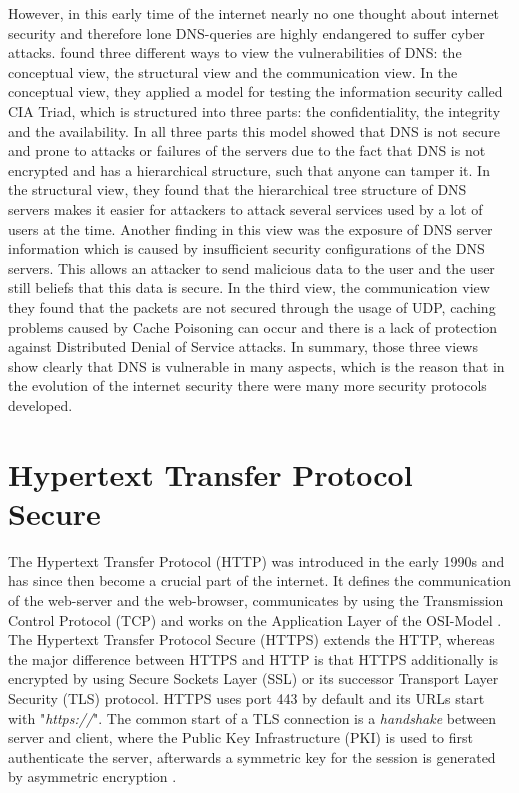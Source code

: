 However, in this early time of the internet nearly no one thought about internet security and therefore lone DNS-queries are highly endangered to suffer cyber attacks. \cite{kim2020survey} found three different ways to view the vulnerabilities of DNS: the conceptual view, the structural view and the communication view. In the conceptual view, they applied a model for testing the information security called CIA Triad, which is structured into three parts: the confidentiality, the integrity and the availability. In all three parts this model showed that DNS is not secure and prone to attacks or failures of the servers due to the fact that DNS is not encrypted and has a hierarchical structure, such that anyone can tamper it. In the structural view, they found that the hierarchical tree structure of DNS servers makes it easier for attackers to attack several services used by a lot of users at the time. Another finding in this view was the exposure of DNS server information which is caused by insufficient security configurations of the DNS servers. This allows an attacker to send malicious data to the user and the user still beliefs that this data is secure. In the third view, the communication view they found that the packets are not secured through the usage of UDP, caching problems caused by Cache Poisoning can occur and there is a lack of protection against Distributed Denial of Service attacks. In summary, those three views show clearly that DNS is vulnerable in many aspects, which is the reason that in the evolution of the internet security there were many more security protocols developed.

\section{Hypertext Transfer Protocol Secure} \label{https}
The Hypertext Transfer Protocol (HTTP) \cite{RFC2616} was introduced in the early 1990s and has since then become a crucial part of the internet. It defines the communication of the web-server and the web-browser, communicates by using the Transmission Control Protocol (TCP) \cite{borman2014rfc7323} and works on the Application Layer of the OSI-Model \cite{silberschatz2013OSConcepts}. The Hypertext Transfer Protocol Secure (HTTPS) \cite{RFC2818} extends the HTTP, whereas the major difference between HTTPS and HTTP is that HTTPS additionally is encrypted by using Secure Sockets Layer (SSL) \cite{RFC6101} or its successor Transport Layer Security (TLS) \cite{RFC2246} protocol. HTTPS uses port 443 by default and its URLs start with "\textit{https://}". The common start of a TLS connection \cite{naylor2014costs} is a \textit{handshake} between server and client, where the Public Key Infrastructure (PKI) is used to first authenticate the server, afterwards a symmetric key for the session is generated by asymmetric encryption \cite{coulouris2012DistributedSystems}.

